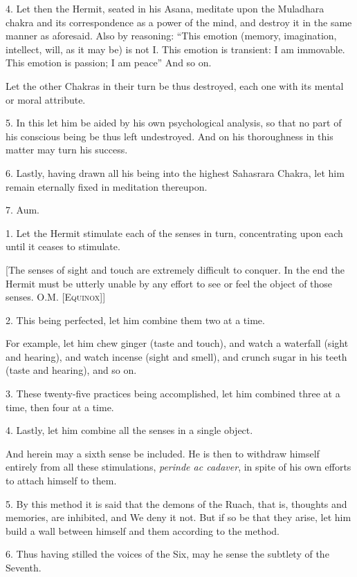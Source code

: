 4. Let then the Hermit, seated in his Asana, meditate upon the Muladhara chakra and its correspondence as a power of the mind, and destroy it in the same manner as aforesaid. Also by reasoning: \enquote{This emotion (memory, imagination, intellect, will, as it may be) is not I. This emotion is transient: I am immovable. This emotion is passion; I am peace} And so on.

Let the other Chakras in their turn be thus destroyed, each one with its mental or moral attribute.

5. In this let him be aided by his own psychological analysis, so that no part of his conscious being be thus left undestroyed. And on his thoroughness in this matter may turn his success.

6. Lastly, having drawn all his being into the highest Sahasrara Chakra, let him remain eternally fixed in meditation thereupon.

7. Aum.


1. Let the Hermit stimulate each of the senses in turn, concentrating upon each until it ceases to stimulate.

[The senses of sight and touch are extremely difficult to conquer. In the end the Hermit must be utterly unable by any effort to see or feel the object of those senses. O.M. \textsc{[Equinox]}]

2.  This being perfected, let him combine them two at a time.

For example, let him chew ginger (taste and touch), and watch a waterfall (sight and hearing), and watch incense (sight and smell), and crunch sugar in his teeth (taste and hearing), and so on.

3. These twenty-five practices being accomplished, let him combined three at a time, then four at a time.

4. Lastly, let him combine all the senses in a single object.

And herein may a sixth sense be included. He is then to withdraw himself entirely from all these stimulations, \textit{perinde ac cadaver}, in spite of his own efforts to attach himself to them.

5. By this method it is said that the demons of the Ruach, that is, thoughts and memories, are inhibited, and We deny it not. But if so be that they arise, let him build a wall between himself and them according to the method.

6. Thus having stilled the voices of the Six, may he sense the subtlety of the Seventh.

